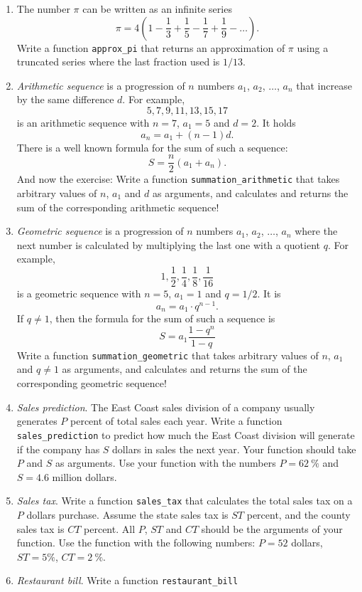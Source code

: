\documentclass[article,A4,12pt]{llncs}
\begin{document}
\begin{enumerate}
\item The number $\pi$ can be written as an infinite series 
$$
\pi = 4\left(1 - \frac{1}{3} + \frac{1}{5} - \frac{1}{7} + \frac{1}{9} - \ldots     \right).
$$
Write a function {\tt approx\_pi} that returns an approximation of $\pi$ using a truncated 
series where the last fraction used is $1/13$.
\item {\em Arithmetic sequence} is a progression of $n$ numbers $a_1$, $a_2$, $\ldots$, $a_n$
that increase by the same difference $d$. For example, 
$$
5, 7, 9, 11, 13, 15, 17
$$
is an arithmetic sequence with $n = 7$, $a_1 = 5$ and $d = 2$. It holds
$$
a_n = a_1 + (n-1)d.
$$
There is a well known formula for the sum of such a sequence:
$$
S = \frac{n}{2}(a_1 + a_n).
$$
And now the exercise: Write a function {\tt summation\_arithmetic} that takes arbitrary 
values of $n$, $a_1$ and $d$ as arguments, and calculates and returns the sum
of the corresponding arithmetic sequence! 
\item {\em Geometric sequence} is a progression of $n$ numbers $a_1$, $a_2$, $\ldots$, $a_n$
where the next number is calculated by multiplying the last one with a quotient $q$.
For example, 
$$
1, \frac{1}{2}, \frac{1}{4}, \frac{1}{8}, \frac{1}{16}
$$
is a geometric sequence with $n = 5$, $a_1 = 1$ and $q = 1/2$. It is 
$$
a_n = a_1 \cdot q^{n-1}.
$$
If $q \not = 1$, then the formula for the sum of such a sequence is
$$
S = a_1\frac{1 - q^n}{1 - q}
$$
Write a function {\tt summation\_geometric} that takes arbitrary 
values of $n$, $a_1$ and $q \not = 1$ as arguments, and calculates 
and returns the sum of the corresponding geometric sequence! 
\item {\em Sales prediction}. The East Coast sales division of a company usually generates $P$
percent of total sales each year. Write a function {\tt sales\_prediction} to predict how much 
the East Coast division will generate if the company has $S$ dollars in sales the next year. 
Your function should take $P$ and $S$ as arguments. Use
your function with the numbers $P = 62\ \%$ and $S = 4.6$ million dollars. 
\item {\em Sales tax}. 
Write a function {\tt sales\_tax} that calculates the total sales tax on a $P$ dollars purchase. 
Assume the state sales tax is $ST$ percent, and the county sales tax is $CT$ percent. All $P$, $ST$ and 
$CT$ should be the arguments of your function. Use the
function with the following numbers: $P = 52$ dollars, $ST = 5 \%$, $CT = 2 \ \%$.
\item {\em Restaurant bill}. Write a function {\tt restaurant\_bill} 

\end{enumerate}
\end{document}
